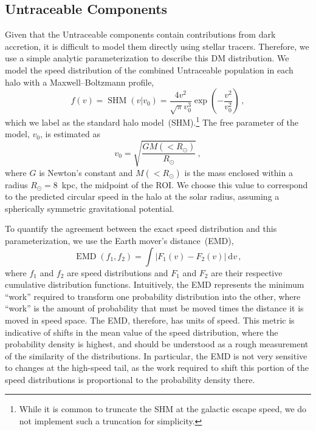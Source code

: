 \documentclass[twocolumn,tighten,twocolappendix]{aastex701}
\begin{document}
\subsection{Untraceable Components} \label{subsec:old_untraceable}
Given that the Untraceable components contain contributions from dark accretion, it is difficult to model them directly using stellar tracers. Therefore, we use a simple analytic parameterization to describe this DM distribution. We model the speed distribution of the combined Untraceable population in each halo with a Maxwell--Boltzmann profile, 
\begin{equation}
    f(v) = \operatorname{SHM}(v|v_0) = \frac{4v^2}{\sqrt{\pi}v_0^3}\exp\left(-\frac{v^2}{v_0^2}\right) \, ,
    \label{eq:maxwell}
\end{equation}
which we label as the standard halo model~(SHM).\footnote{While it is common to truncate the SHM at the galactic escape speed,  we do not implement such a truncation for simplicity.} The free parameter of the model, $v_0$, is estimated as
\begin{equation} \label{eq:v0}
    v_0 = \sqrt{\frac{GM(<R_\odot)}{R_\odot}} \, ,
\end{equation}
where $G$ is Newton's constant and $M(<R_\odot)$ is the mass enclosed within a radius $R_\odot=8$~kpc, the midpoint of the ROI. We choose this value to correspond to the predicted circular speed in the halo at the solar radius, assuming a spherically symmetric gravitational potential.

To quantify the agreement between the exact speed distribution and this parameterization, we use the Earth mover's distance~(EMD), 
\begin{equation}
    \operatorname{EMD}(f_1,f_2) = \int\!\left| F_1(v) - F_2(v) \right|\ \mathrm{d}v \,,
\end{equation}
where $f_1$ and $f_2$ are speed distributions and $F_1$ and $F_2$ are their respective cumulative distribution functions. Intuitively, the EMD represents the minimum ``work'' required to transform one probability distribution into the other, where ``work'' is the amount of probability that must be moved times the distance it is moved in speed space. The EMD, therefore, has units of speed. This metric is  indicative of shifts in the mean value of the speed distribution, where the probability density is highest, and should be understood as a rough measurement of the similarity of the distributions. In particular, the EMD is not very sensitive to changes at the high-speed tail, as the work required to shift this portion of the speed distributions is proportional to the probability density there. 
\end{document}
